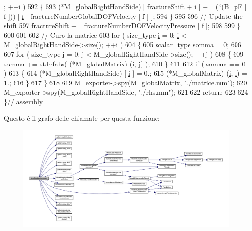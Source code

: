 \begin{DoxyCode}
      [ f ]; ++\hyperlink{matrici_8m_a6f6ccfcf58b31cb6412107d9d5281426}{i} )
592         \{
593                 (*M\_globalRightHandSide) [ fractureShift + \hyperlink{matrici_8m_a6f6ccfcf58b31cb6412107d9d5281426}{i} ] += (*(B\_pF [ f ])) [ 
      \hyperlink{matrici_8m_a6f6ccfcf58b31cb6412107d9d5281426}{i} - fractureNumberGlobalDOFVelocity [ f ] ];
594         \}
595         
596         \textcolor{comment}{// Update the shift}
597         fractureShift += fractureNumberDOFVelocityPressure [ f ];
598         
599     \}
600 
601 
602     \textcolor{comment}{// Curo la matrice}
603     \textcolor{keywordflow}{for} ( size\_type \hyperlink{matrici_8m_a6f6ccfcf58b31cb6412107d9d5281426}{i} = 0; \hyperlink{matrici_8m_a6f6ccfcf58b31cb6412107d9d5281426}{i} < M\_globalRightHandSide->size(); ++\hyperlink{matrici_8m_a6f6ccfcf58b31cb6412107d9d5281426}{i} )
604     \{
605         scalar\_type somma = 0;
606 
607         \textcolor{keywordflow}{for} ( size\_type j = 0; j < M\_globalRightHandSide->size(); ++j )
608         \{
609             somma += std::fabs( (*M\_globalMatrix) (\hyperlink{matrici_8m_a6f6ccfcf58b31cb6412107d9d5281426}{i}, j) );
610         \}
611 
612         \textcolor{keywordflow}{if} ( somma == 0 )
613         \{
614             (*M\_globalRightHandSide) [ \hyperlink{matrici_8m_a6f6ccfcf58b31cb6412107d9d5281426}{i} ] = 0.;
615             (*M\_globalMatrix) (\hyperlink{matrici_8m_a6f6ccfcf58b31cb6412107d9d5281426}{i}, \hyperlink{matrici_8m_a6f6ccfcf58b31cb6412107d9d5281426}{i}) = 1.;
616         \}
617     \}
618 
619     M\_exporter->spy(M\_globalMatrix, \textcolor{stringliteral}{"./matrice.mm"});
620     M\_exporter->spy(M\_globalRightHandSide, \textcolor{stringliteral}{"./rhs.mm"});
621 
622     \textcolor{keywordflow}{return};
623     
624 \}\textcolor{comment}{// assembly}
\end{DoxyCode}


Questo è il grafo delle chiamate per questa funzione\-:\nopagebreak
\begin{figure}[H]
\begin{center}
\leavevmode
\includegraphics[width=350pt]{classDarcyFractured_a7af785ff47dda6db2bcc0846c47877c1_cgraph}
\end{center}
\end{figure}


